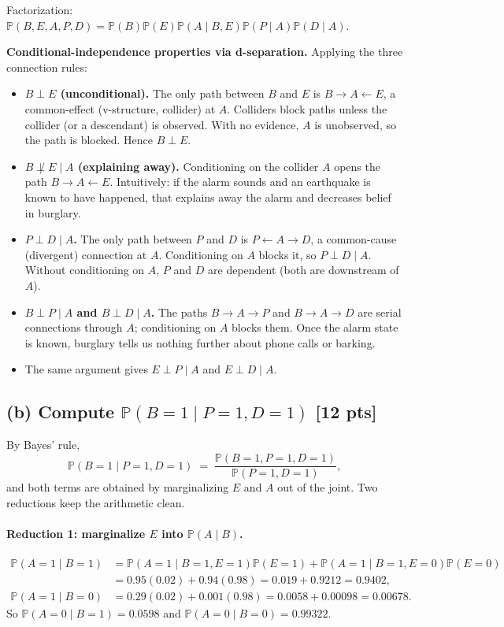 \documentclass[12pt]{article}
\newcommand{\Prb}{\mathbb{P}}
\begin{document}
Factorization: $\Prb(B,E,A,P,D)=\Prb(B)\Prb(E)\Prb(A\mid B,E)\Prb(P\mid A)\Prb(D\mid A)$.

\textbf{Conditional-independence properties via d-separation.} Applying the three connection rules:
\begin{itemize}[leftmargin=1.5em,itemsep=3pt]
  \item \textbf{$B\perp E$ (unconditional).} The only path between $B$ and $E$ is $B\to A\leftarrow E$, a common-effect (v-structure, collider) at $A$. Colliders block paths unless the collider (or a descendant) is observed. With no evidence, $A$ is unobserved, so the path is blocked. Hence $B\perp E$.
  \item \textbf{$B\not\perp E\mid A$ (explaining away).} Conditioning on the collider $A$ opens the path $B\to A\leftarrow E$. Intuitively: if the alarm sounds and an earthquake is known to have happened, that explains away the alarm and decreases belief in burglary.
  \item \textbf{$P\perp D\mid A$.} The only path between $P$ and $D$ is $P\leftarrow A\to D$, a common-cause (divergent) connection at $A$. Conditioning on $A$ blocks it, so $P\perp D\mid A$. Without conditioning on $A$, $P$ and $D$ are dependent (both are downstream of $A$).
  \item \textbf{$B\perp P\mid A$ and $B\perp D\mid A$.} The paths $B\to A\to P$ and $B\to A\to D$ are serial connections through $A$; conditioning on $A$ blocks them. Once the alarm state is known, burglary tells us nothing further about phone calls or barking.
  \item The same argument gives $E\perp P\mid A$ and $E\perp D\mid A$.
\end{itemize}

\subsection*{(b) Compute $\Prb(B=1\mid P=1,D=1)$ [12 pts]}

By Bayes' rule,
\[
  \Prb(B=1\mid P=1,D=1) \;=\; \frac{\Prb(B=1,P=1,D=1)}{\Prb(P=1,D=1)},
\]
and both terms are obtained by marginalizing $E$ and $A$ out of the joint. Two reductions keep the arithmetic clean.

\paragraph{Reduction 1: marginalize $E$ into $\Prb(A\mid B)$.}
\begin{align*}
  \Prb(A=1\mid B=1) &= \Prb(A=1\mid B=1,E=1)\Prb(E=1)+\Prb(A=1\mid B=1,E=0)\Prb(E=0)\\
  &= 0.95(0.02)+0.94(0.98) = 0.019+0.9212 = 0.9402,\\
  \Prb(A=1\mid B=0) &= 0.29(0.02)+0.001(0.98) = 0.0058+0.00098 = 0.00678.
\end{align*}
So $\Prb(A=0\mid B=1)=0.0598$ and $\Prb(A=0\mid B=0)=0.99322$.
\end{document}
